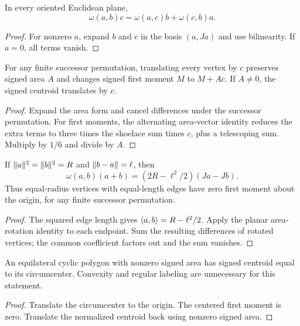 \begin{lemma}
\label{lem:area-vector-triple}
\leanok
In every oriented Euclidean plane,
\[
 \omega(a,b)c=\omega(a,c)b+\omega(c,b)a.
\]
\end{lemma}
\begin{proof}
\leanok
For nonzero $a$, expand $b$ and $c$ in the basis $(a,Ja)$ and use
bilinearity. If $a=0$, all terms vanish.
\end{proof}

\begin{proposition}
\label{prop:moment-translation}
\leanok
{}
For any finite successor permutation, translating every vertex by $c$
preserves signed area $A$ and changes signed first moment $M$ to $M+Ac$.
If $A\ne0$, the signed centroid translates by $c$.
\end{proposition}
\begin{proof}
\leanok
Expand the area form and cancel differences under the successor
permutation. For first moments, the alternating area-vector identity
reduces the extra terms to three times the shoelace sum times $c$,
plus a telescoping sum. Multiply by $1/6$ and divide by $A$.
\end{proof}

\begin{lemma}
\label{lem:cyclic-moment-zero}
\leanok
{}
If $\lVert a\rVert^2=\lVert b\rVert^2=R$ and $\lVert b-a\rVert=\ell$, then
\[
 \omega(a,b)(a+b)=(2R-\ell^2/2)(Ja-Jb).
\]
Thus equal-radius vertices with equal-length edges have zero first moment
about the origin, for any finite successor permutation.
\end{lemma}
\begin{proof}
\leanok
The squared edge length gives $\langle a,b\rangle=R-\ell^2/2$. Apply the planar
area-rotation identity to each endpoint. Sum the resulting differences
of rotated vertices; the common coefficient factors out and the sum vanishes.
\end{proof}

\begin{proposition}
\label{prop:cyclic-centroid}
\leanok
{}
An equilateral cyclic polygon with nonzero signed area has signed
centroid equal to its circumcenter. Convexity and regular labeling are
unnecessary for this statement.
\end{proposition}
\begin{proof}
\leanok
Translate the circumcenter to the origin. The centered first moment is
zero. Translate the normalized centroid back using nonzero signed area.
\end{proof}


